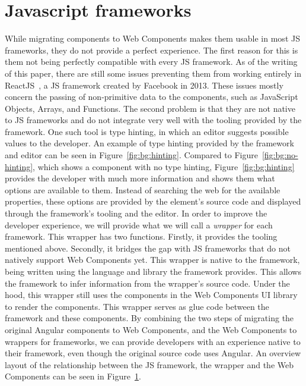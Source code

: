 \begin{figure}[htbp]
  \label{fig:bg:wrapper-diagram}
  \centering
\end{figure}


\section{Javascript frameworks}\label{sec:bg:jsframeworks}
While migrating components to Web Components makes them usable in most JS frameworks, they do not provide a perfect experience. The first reason for this is them not being perfectly compatible with every JS framework. As of the writing of this paper, there are still some issues preventing them from working entirely in ReactJS~, a JS framework created by Facebook in 2013. These issues mostly concern the passing of non-primitive data to the components, such as JavaScript Objects, Arrays, and Functions. The second problem is that they are not native to JS frameworks and do not integrate very well with the tooling provided by the framework. One such tool is type hinting, in which an editor suggests possible values to the developer. An example of type hinting provided by the framework and editor can be seen in Figure~\ref{fig:bg:hinting}. Compared to Figure~\ref{fig:bg:no-hinting}, which shows a component with no type hinting, Figure~\ref{fig:bg:hinting} provides the developer with much more information and shows them what options are available to them. Instead of searching the web for the available properties, these options are provided by the element's source code and displayed through the framework's tooling and the editor. In order to improve the developer experience, we will provide what we will call a \emph{wrapper} for each framework. This wrapper has two functions. Firstly, it provides the tooling mentioned above. Secondly, it bridges the gap with JS frameworks that do not natively support Web Components yet. This wrapper is native to the framework, being written using the language and library the framework provides. This allows the framework to infer information from the wrapper's source code. Under the hood, this wrapper still uses the components in the Web Components UI library to render the components. This wrapper serves as glue code between the framework and these components. By combining the two steps of migrating the original Angular components to Web Components, and the Web Components to wrappers for frameworks, we can provide developers with an experience native to their framework, even though the original source code uses Angular. An overview layout of the relationship between the JS framework, the wrapper and the Web Components can be seen in Figure~\ref{fig:bg:wrapper-diagram}.

